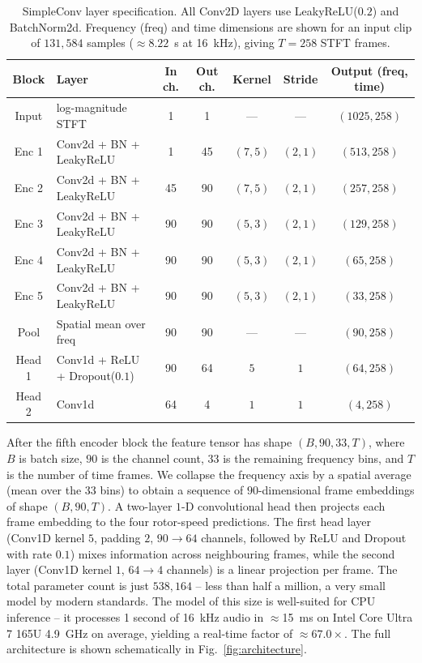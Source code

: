 \documentclass{QD_2026}
\begin{document}
\begin{table}[ht]
  \centering
  \caption{SimpleConv layer specification.
    All Conv2D layers use LeakyReLU($0.2$) and BatchNorm2d.
    Frequency (freq) and time dimensions are shown for an input clip of
    $131{,}584$ samples ($\approx 8.22$~s at \SI{16}{\kilo\hertz}),
    giving $T = 258$ STFT frames.
  }
  \label{tab:arch}
  \small
  \begin{tabular}{clccccc}
    \toprule
    Block & Layer & In ch. & Out ch. & Kernel & Stride & Output (freq, time) \\
    \midrule
    Input & log-magnitude STFT & 1 & 1 & --- & --- & $(1025, 258)$ \\
    Enc 1 & Conv2d + BN + LeakyReLU & 1 & 45 & $(7, 5)$ & $(2, 1)$ & $(513, 258)$ \\
    Enc 2 & Conv2d + BN + LeakyReLU & 45 & 90 & $(7, 5)$ & $(2, 1)$ & $(257, 258)$ \\
    Enc 3 & Conv2d + BN + LeakyReLU & 90 & 90 & $(5, 3)$ & $(2, 1)$ & $(129, 258)$ \\
    Enc 4 & Conv2d + BN + LeakyReLU & 90 & 90 & $(5, 3)$ & $(2, 1)$ & $(65, 258)$ \\
    Enc 5 & Conv2d + BN + LeakyReLU & 90 & 90 & $(5, 3)$ & $(2, 1)$ & $(33, 258)$ \\
    Pool & Spatial mean over freq & 90 & 90 & --- & --- & $(90, 258)$ \\
    Head 1 & Conv1d + ReLU + Dropout($0.1$) & 90 & 64 & $5$ & $1$ & $(64, 258)$ \\
    Head 2 & Conv1d & 64 & 4 & $1$ & $1$ & $(4, 258)$ \\
    \bottomrule
  \end{tabular}
\end{table}

After the fifth encoder block the feature tensor has shape
$(B, 90, 33, T)$, where $B$ is batch size, $90$ is the channel count, $33$ is
the remaining frequency bins, and $T$ is the number of time frames.
We collapse the frequency axis by a spatial average (mean over the $33$ bins)
to obtain a sequence of $90$-dimensional frame embeddings of shape $(B, 90, T)$.
A two-layer $1$-D convolutional head then projects each frame embedding to the
four rotor-speed predictions.
The first head layer (Conv1D kernel $5$, padding $2$, $90 \to 64$ channels,
followed by ReLU and Dropout with rate $0.1$) mixes information across
neighbouring frames, while the second layer (Conv1D kernel $1$, $64 \to 4$
channels) is a linear projection per frame.
The total parameter count is just $538,164$ -- less than half a million, a very small model by modern standards. The model of this size is well-suited for CPU inference -- it processes 1 second of \SI{16}{\kilo\hertz} audio in $\approx$\SI{15}{\milli\second} on Intel Core Ultra 7 165U \SI{4.9}{\giga\hertz} on average, yielding a real-time factor of $\approx 67.0\times$.
The full architecture is shown schematically in Fig.~\ref{fig:architecture}.
\end{document}
